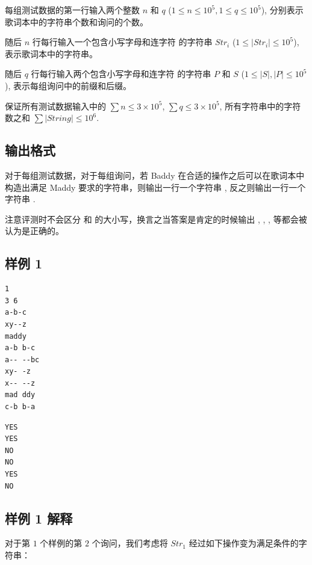 每组测试数据的第一行输入两个整数 $n$ 和 $q$ ($1 \le n \le 10^5, 1 \le q \le 10^5$), 分别表示歌词本中的字符串个数和询问的个数。

随后 $n$ 行每行输入一个包含小写字母和连字符 \TT{-} 的字符串 $Str_i$ ($1 \le |Str_i| \le 10^5$), 表示歌词本中的字符串。

随后 $q$ 行每行输入两个包含小写字母和连字符 \TT{-} 的字符串 $P$ 和 $S$ ($1 \le |S|,|P| \le 10^5$), 表示每组询问中的前缀和后缀。

保证所有测试数据输入中的 $\sum n \le 3 \times 10^5$, $\sum q \le 3 \times 10^5$, 所有字符串中的字符数之和 $\sum |String| \le 10^6$.

\subsection{输出格式}

对于每组测试数据，对于每组询问，若 Baddy 在合适的操作之后可以在歌词本中构造出满足 Maddy 要求的字符串，则输出一行一个字符串 , 反之则输出一行一个字符串 .

注意评测时不会区分  和  的大小写，换言之当答案是肯定的时候输出 , , ,  等都会被认为是正确的。

\subsection{样例 1}

\begin{minipage}{\linewidth}
   \begin{minipage}[t]{0.49\linewidth}
      \begin{lstlisting}[title=\texttt{standard input}]
1
3 6
a-b-c
xy--z
maddy
a-b b-c
a-- --bc
xy- -z
x-- --z
mad ddy
c-b b-a
\end{lstlisting}
   \end{minipage}
   \begin{minipage}[t]{0.49\linewidth}
      \begin{lstlisting}[title=\texttt{standard output}]
YES
YES
NO
NO
YES
NO
\end{lstlisting}
   \end{minipage}
\end{minipage}

\subsection{样例 1 解释}

对于第 $1$ 个样例的第 $2$ 个询问，我们考虑将 $Str_1$ 经过如下操作变为满足条件的字符串：

